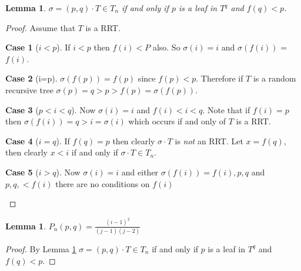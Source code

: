 \documentclass[12pt]{article} %
\newtheorem{lem}[thm]{Lemma}
\theoremstyle{definition}
\newtheorem{case}{Case}
\begin{document}
\begin{lem}\label{lem:rrtperm}
 $\sigma  = (p,q) \cdot T \in T_n$ if and only if $p$ is a leaf in $T^q$ and $f(q)< p$. 
\end{lem}
\begin{proof}
Assume that $T$ is a RRT.  
\begin{case}[$i<p$]
 If $i < p$ then $f(i) <P$ also. So $\sigma(i) = i$ and $\sigma(f(i))$ = $f(i)$.
\end{case}
\begin{case}[i=p]
 $\sigma(f(p)) = f(p)$ since $f(p) <p$.  Therefore if $T$ is a random recursive tree $\sigma(p) = q  > p > f(p)  = \sigma(f(p))$.
\end{case}
\begin{case}[$p<i<q$]
 Now $\sigma(i) = i$ and $f(i) < i <q$.  Note that if $f(i) = p$ then $\sigma(f(i)) = q > i  = \sigma(i)$ which occurs if and only of $T$ is a RRT.  
\end{case}
\begin{case}[$i=q$]
 If $f(q) = p$ then clearly $\sigma \cdot T$ is \emph{not} an RRT.  Let $x = f(q)$, then clearly $x <i$ if and only if $\sigma  \cdot T \in T_n$. 
\end{case}
\begin{case}[$i>q$]
Now $\sigma(i) = i$ and either $\sigma(f(i)) = f(i),p,q $ and $p,q, < f(i)$ there are no conditions on $f(i)$
\end{case}
\end{proof}


\begin{lem}
 $P_n(p,q) = \frac{(i-1)^{2}}{(j-1)(j-2)}$ 
\end{lem}
\begin{proof}
 By Lemma \ref{lem:rrtperm}  $\sigma  = (p,q) \cdot T \in T_n$ if and only if $p$ is a leaf in $T^q$ and $f(q)< p$.  
\end{proof}

 
 
 
 
\end{document}
